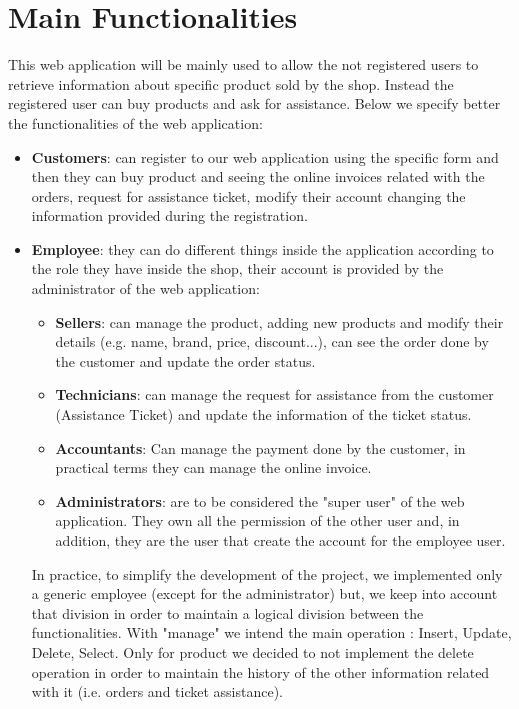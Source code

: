 \section{Main Functionalities}

This web application will be mainly used to allow the not registered users to retrieve information about specific product sold by the shop. Instead the registered user can buy products and ask for assistance. Below we specify better the functionalities of the web application:
\begin{itemize}
    \item \textbf{Customers}: can register to our web application using the specific form and then they can buy product and seeing the online invoices related with the orders, request for assistance ticket, modify their account changing the information provided during the registration.
    \item \textbf{Employee}: they can do different things inside the application according to the role they have inside the shop, their account is provided by the administrator of the web application:
    \begin{itemize}
        \item \textbf{Sellers}: can manage the product, adding new products and modify their details (e.g. name, brand, price, discount...), can see the order done by the customer and update the order status.
        \item \textbf{Technicians}: can manage the request for assistance from the customer (Assistance Ticket) and update the information of the ticket status.
        \item \textbf{Accountants}: Can manage the payment done by the customer, in practical terms they can manage the online invoice.
        \item \textbf{Administrators}: are to be considered the "super user" of the web application. They own all the permission of the other user and, in addition, they are the user that create the account for the employee user.
    \end{itemize}
    In practice, to simplify the development of the project, we implemented only a generic employee (except for the administrator) but, we keep into account that division in order to maintain a logical division between the functionalities.
    With "manage" we intend the main operation : Insert, Update, Delete, Select. Only for product we decided to not implement the delete operation in order to maintain the history of the other information related with it (i.e. orders and ticket assistance).
\end{itemize}